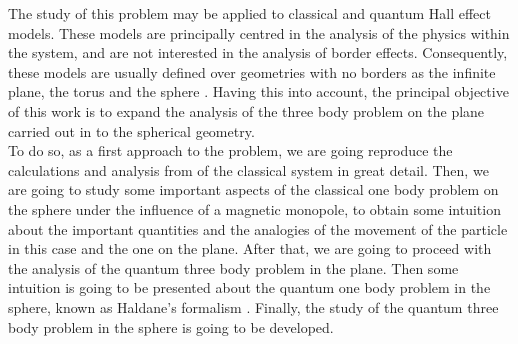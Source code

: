 The study of this problem may be applied to classical and quantum Hall effect models. These models are principally centred in the analysis of the physics within the system, and are not interested in the analysis of border effects. Consequently, these models are usually defined over geometries with no borders as the infinite plane, the torus and the sphere \cite{schlief}. Having this into account, the principal objective of this work is to expand the analysis of the three body problem on the plane carried out in \cite{alonso} to the spherical geometry.\\

To do so, as a first approach to the problem, we are going reproduce the calculations and analysis from \cite{alonso} of the classical system in great detail. Then, we are going to study some important aspects of the classical one body problem on the sphere under the influence of a magnetic monopole, to obtain some intuition about the important quantities and the analogies of the movement of the particle in this case and the one on the plane. After that, we are going to proceed with the analysis of the quantum three body problem in the plane. Then some intuition is going to be presented about the quantum one body problem in the sphere, known as Haldane's formalism \cite{haldane}. Finally, the study of the quantum three body problem in the sphere is going to be developed.\\
